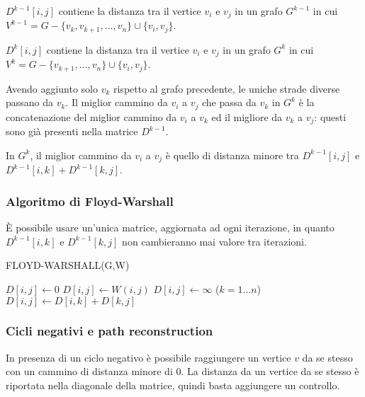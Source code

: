 \documentclass[11pt]{article}
\begin{document}
$D^{k-1}[i,j]$ contiene la distanza tra il vertice $v_i$ e $v_j$ in un grafo $G^{k-1}$ in cui 
$V^{k-1}=G-\{v_k,v_{k+1},\dots,v_n\}\cup\{v_i,v_j\}$. 

$D^k[i,j]$ contiene la distanza tra il vertice $v_i$ e $v_j$ in un grafo $G^k$ in cui 
$V^k=G-\{v_{k+1},\dots,v_n\}\cup\{v_i,v_j\}$.

Avendo aggiunto solo $v_k$ rispetto al grafo precedente, le uniche strade diverse passano da $v_k$. Il miglior cammino da 
$v_i$ a $v_j$ che passa da $v_k$ in $G^k$ è la concatenazione del miglior cammino da $v_i$ a $v_k$ ed il migliore da $v_k$
a $v_j$: questi sono già presenti nella matrice $D^{k-1}$.

In $G^k$, il miglior cammino da $v_i$ a $v_j$ è quello di distanza minore tra $D^{k-1}[i,j]$ e $D^{k-1}[i,k]+D^{k-1}[k,j]$.
\subsubsection{Algoritmo di Floyd-Warshall}
È possibile usare un'unica matrice, aggiornata ad ogni iterazione, in quanto $D^{k-1}[i,k]$ e $D^{k-1}[k,j]$ non cambieranno 
mai valore tra iterazioni.
\begin{algorithm}
    \caption{FLOYD-WARSHALL(G,W)}
    \begin{algorithmic}
                    \State $D[i,j]\gets 0$
                    \State $D[i,j]\gets W(i,j)$
                \Else
                    \State $D[i,j]\gets \infty$
                \EndIf 
            \EndFor 
        \EndFor 
        \For($k=1\dots n$) 
                        \State $D[i,j]\gets D[i,k]+D[k,j]$
                    \EndIf 
                \EndFor 
            \EndFor 
        \EndFor 
    \end{algorithmic}
\end{algorithm}
\subsubsection{Cicli negativi e path reconstruction}
In presenza di un ciclo negativo è possibile raggiungere un vertice $v$ da se stesso con un cammino di distanza minore di 0.
La distanza da un vertice da se stesso è riportata nella diagonale della matrice, quindi basta aggiungere un controllo.
\end{document}
